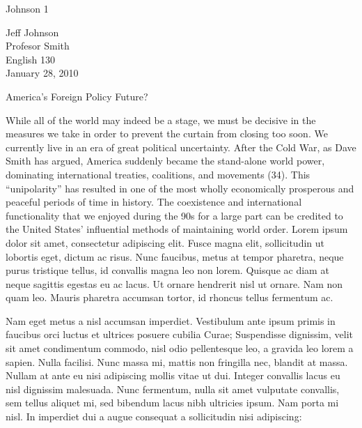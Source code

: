 \newpage

\thispagestyle{empty}
\begin{flushright}Johnson 1\end{flushright}
\bigskip
\begin{Spacing}{2}
Jeff Johnson\\
Profesor Smith\\
English 130\\
January 28, 2010
\end{Spacing}
\begin{center}
America's Foreign Policy Future?
\end{center}
\begin{Spacing}{2}

\hspace{.4in}While all of the world may indeed be a stage, we must be decisive in the measures we take in order to prevent the curtain from closing too soon. We currently live in an era of great political uncertainty. After the Cold War, as Dave Smith has argued, America suddenly became the stand-alone world power, dominating international treaties, coalitions, and movements (34). This ``unipolarity'' has resulted in one of the most wholly economically prosperous and peaceful periods of time in history. The coexistence and international functionality that we enjoyed during the 90s for a large part can be credited to the United States' influential methods of maintaining world order. Lorem ipsum dolor sit amet, consectetur adipiscing elit. Fusce magna elit, sollicitudin ut lobortis eget, dictum ac risus. Nunc faucibus, metus at tempor pharetra, neque purus tristique tellus, id convallis magna leo non lorem. Quisque ac diam at neque sagittis egestas eu ac lacus. Ut ornare hendrerit nisl ut ornare. Nam non quam leo. Mauris pharetra accumsan tortor, id rhoncus tellus fermentum ac. 

\hspace{.4in}Nam eget metus a nisl accumsan imperdiet. Vestibulum ante ipsum primis in faucibus orci luctus et ultrices posuere cubilia Curae; Suspendisse dignissim, velit sit amet condimentum commodo, nisl odio pellentesque leo, a gravida leo lorem a sapien. Nulla facilisi. Nunc massa mi, mattis non fringilla nec, blandit at massa. Nullam at ante eu nisi adipiscing mollis vitae ut dui. Integer convallis lacus eu nisl dignissim malesuada. Nunc fermentum, nulla sit amet vulputate convallis, sem tellus aliquet mi, sed bibendum lacus nibh ultricies ipsum. Nam porta mi nisl. In imperdiet dui a augue consequat a sollicitudin nisi adipiscing:


\end{Spacing}
